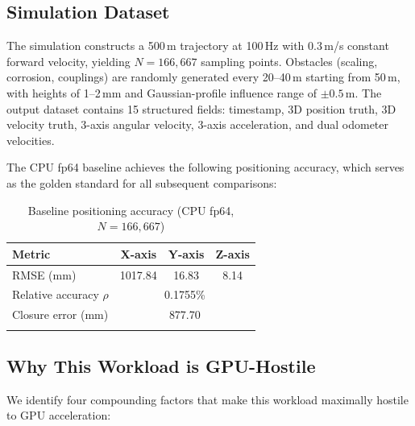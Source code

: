 \documentclass[pdflatex,sn-mathphys-num]{sn-jnl}%
\theoremstyle{thmstyleone}%
\theoremstyle{thmstyletwo}%
\theoremstyle{thmstylethree}%
\begin{document}
\subsection{Simulation Dataset}\label{subsec:dataset}

The simulation constructs a 500\,m trajectory at 100\,Hz with 0.3\,m/s constant forward velocity, yielding $N = 166{,}667$ sampling points. Obstacles (scaling, corrosion, couplings) are randomly generated every 20--40\,m starting from 50\,m, with heights of 1--2\,mm and Gaussian-profile influence range of $\pm 0.5$\,m. The output dataset contains 15 structured fields: timestamp, 3D position truth, 3D velocity truth, 3-axis angular velocity, 3-axis acceleration, and dual odometer velocities.

The CPU fp64 baseline achieves the following positioning accuracy, which serves as the golden standard for all subsequent comparisons:

\begin{table}[h]
\caption{Baseline positioning accuracy (CPU fp64, $N=166{,}667$)}\label{tab:baseline}
\begin{tabular}{@{}lccc@{}}
\toprule
Metric & X-axis & Y-axis & Z-axis \\
\midrule
RMSE (mm) & 1017.84 & 16.83 & 8.14 \\
Relative accuracy $\rho$ & \multicolumn{3}{c}{0.1755\%} \\
Closure error (mm) & \multicolumn{3}{c}{877.70} \\
\botrule
\end{tabular}
\end{table}

\subsection{Why This Workload is GPU-Hostile}\label{subsec:gpu_hostile}

We identify four compounding factors that make this workload maximally hostile to GPU acceleration:
\end{document}
